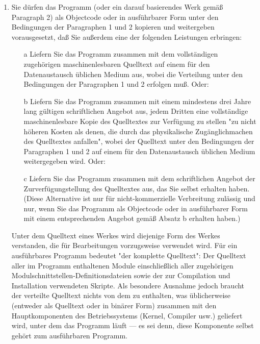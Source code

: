 {\begin{enumerate}
Somit ist es nicht die Absicht dieses Abschnittes, Rechte für Werke in Anspruch zu nehmen oder Ihnen die Rechte für Werke streitig zu machen, die komplett von Ihnen geschrieben wurden; vielmehr ist es die Absicht, die Rechte zur Kontrolle der Verbreitung von Werken, die auf dem Programm basieren oder unter seiner auszugsweisen Verwendung zusammengestellt worden sind, auszuüben.

Ferner bringt auch das einfache Zusammenlegen eines anderen Werkes, das nicht auf dem Programm basiert, mit dem Programm oder einem auf dem Programm basierenden Werk auf ein- und demselben Speicher- oder Vertriebsmedium dieses andere Werk nicht in den Anwendungsbereich dieser Lizenz.

\item Sie dürfen das Programm (oder ein darauf basierendes Werk gemäß Paragraph 2) als Objectcode oder in ausführbarer Form unter den Bedingungen der Paragraphen 1 und 2 kopieren und weitergeben vorausgesetzt, daß Sie außerdem eine der folgenden Leistungen erbringen:
\begin{itemize}
    \item[a] Liefern Sie das Programm zusammen mit dem vollständigen zugehörigen maschinenlesbaren Quelltext auf einem für den Datenaustausch üblichen Medium aus, wobei die Verteilung unter den Bedingungen der Paragraphen 1 und 2 erfolgen muß. Oder:
    \item[b]Liefern Sie das Programm zusammen mit einem mindestens drei Jahre lang gültigen schriftlichen Angebot aus, jedem Dritten eine vollständige maschinenlesbare Kopie des Quelltextes zur Verfügung zu stellen "zu nicht höheren Kosten als denen, die durch das physikalische Zugänglichmachen des Quelltextes anfallen", wobei der Quelltext unter den Bedingungen der Paragraphen 1 und 2 auf einem für den Datenaustausch üblichen Medium weitergegeben wird. Oder:
    \item[c]Liefern Sie das Programm zusammen mit dem schriftlichen Angebot der Zurverfügungstellung des Quelltextes aus, das Sie selbst erhalten haben. (Diese Alternative ist nur für nicht-kommerzielle Verbreitung zulässig und nur, wenn Sie das Programm als Objectcode oder in ausführbarer Form mit einem entsprechenden Angebot gemäß Absatz b erhalten haben.)
\end{itemize}
Unter dem Quelltext eines Werkes wird diejenige Form des Werkes verstanden, die für Bearbeitungen vorzugsweise verwendet wird. Für ein ausführbares Programm bedeutet "der komplette Quelltext": Der Quelltext aller im Programm enthaltenen Module einschließlich aller zugehörigen Modulschnittstellen-Definitionsdateien sowie der zur Compilation und Installation verwendeten Skripte. Als besondere Ausnahme jedoch braucht der verteilte Quelltext nichts von dem zu enthalten, was üblicherweise (entweder als Quelltext oder in binärer Form) zusammen mit den Hauptkomponenten des Betriebssystems (Kernel, Compiler usw.) geliefert wird, unter dem das Programm läuft --- es sei denn, diese Komponente selbst gehört zum ausführbaren Programm.


\end{enumerate}}

